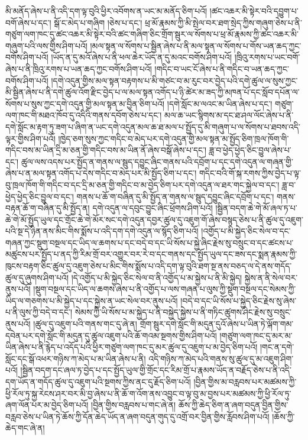 མི་མནོད་ཞེས་པ་ནི་འདི་དག་ལྟ་བུའི་ཕྱིར་འབོགས་ན་ཡང་མ་མནོད་ཅིག་པའོ། །ཚང་འཆར་མི་སྟེར་བའི་དབྱུག་པ་བགོ་ཞེས་པ་དང་། སྒོ་ང་མེད་པ་གཞིག །ཅེས་པ་དང་། ཕྲ་མོ་རྣམས་ཀྱི་མི་སྤེལ་བར་ཐག་སྲེད་ཀྱིས་གཞུག་ཅེས་པ་ནི་གཙུག་ལག་ཁང་དུ་ཚང་འཆར་མི་སྟེར་བའི་ཚང་གཞིག་ཅིང་གྲོག་སྦུར་ལ་སོགས་པ་ཕྲ་མོ་རྣམས་ཀྱི་ཚང་འཆར་མི་གཞུག་པའི་ལས་གྱིས་ཤིག་པའོ། །མལ་སྟན་ལ་སོགས་པ་སྦྱིན་ཞེས་པ་ནི་མལ་སྟན་ལ་སོགས་པ་གོས་ཡན་ཆད་ཀྱང་བགོས་ཤིག་པའོ། །ཡོད་ན་དུ་མའོ་ཞེས་པ་ནི་ཕལ་ཆེར་ཡོད་ན་དུ་མའང་བགོས་ཤིག་པའོ། །ཁྲིའུ་རགས་པ་ཡང་བགོ་ཞེས་པ་ནི་ཁྲིའུ་རགས་པ་ཡན་ཆད་ཀྱང་བགོས་ཤིག་པའོ། །གདིང་བ་ཡང་ངོ་ཞེས་པ་ནི་གདིང་བ་ཡན་ཆད་ཀྱང་བགོས་ཤིག་པའོ། །དགེ་འདུན་གྱིས་མལ་སྟན་བརྟགས་པ་མི་གཙང་བ་མ་རུང་བར་བྱེད་པའི་དགེ་ཚུལ་ལ་སུས་ཀྱང་མི་སྦྱིན་ཞེས་པ་ནི་དགེ་ཚུལ་འོག་རྫིང་བྱེད་པ་ལ་མལ་སྟན་འགོད་པ་ཉི་ཚེར་མ་ཟད་ཀྱི་མཁན་པོ་དང་སློབ་དཔོན་ལ་སོགས་པ་སུས་ཀྱང་དགེ་འདུན་གྱི་མལ་སྟན་མ་བྱིན་ཅིག་པའོ། །དགེ་སློང་མ་ལའང་མ་ཡིན་ཞེས་པ་དང་། གཙུག་ལག་ཁང་གི་མཐའ་ཁོབ་དུ་འདིའི་གནས་དབོག་ཅེས་པ་དང་། མལ་ཆ་ཡང་སྙིགས་མ་དང་ཐ་ཤལ་ལོང་ཞེས་པ་ནི་དགེ་སློང་མ་རྟག་ཏུ་ཟག་པ་ཞིག་ན་ཡང་དགེ་འདུན་མལ་ཆ་ཐ་མལ་པ་སྤྱོད་དུ་མི་གཞུག་པ་ལ་སོགས་པ་ཐབས་འདི་ལྟར་གྱིས་ཤིག་པའོ། །ཁྱེད་ཅག་སུས་ཀྱང་གདིང་བ་མེད་པར་དགེ་འདུན་གྱི་མལ་སྟན་མ་སྤྱོད་ཅིག་ཁྲལ་ཁོག་གི་གདིང་བས་མ་ཡིན་དྲི་མ་ཅན་གྱི་གདིང་བས་མ་ཡིན་ནོ་ཞེས་བསྒོ་ཞེས་པ་དང་། ཟླ་བ་ཕྱེད་ཕྱེད་ཅིང་བྱུལ་ཞེས་པ་དང་། ཚུལ་ལས་འདས་པར་སྤྱོད་ན་གནས་ལ་སྦུད་དབྱུང་ཞིང་གནས་པའི་དབྲོག་པ་དང་དགེ་འདུན་ལ་གཞན་གྱི་ཞེས་པ་ན་མལ་སྟན་འགོད་པ་དེས་གདིང་བ་མེད་པར་མི་སྤྱོད་ཅིག་པ་དང་། གདིང་བའི་གོ་སྐ་རགས་ཀྱིས་བྱེད་པ་ལྟ་བུ་ཁྲལ་ཁོག་གི་གདིང་བ་དང་དྲི་མ་ཅན་གྱི་གདིང་བ་མ་བྱེད་ཅིག་པར་དགེ་འདུན་ལ་ཐར་གང་སྐྱེལ་བ་དང་། ཟླ་བ་ཕྱེད་ཕྱེད་ཅིང་བྱུལ་བ་དང་། གནས་པ་ཆོ་ག་བཞིན་དུ་མི་སྤྱོད་ན་གནས་ལ་སྦུད་དབྱུང་ཞིང་དབྲོག་པ་དང་། གནས་བརྟན་ཆོ་ག་བཞིན་དུ་མི་སྤྱོད་ན། དགེ་འདུན་ལ་དབུང་བྱུང་ཞིང་ཕྲོགས་ཤིག་པའོ། །སྦྱིན་བདག་ཆེ་གེ་མོ་ཞལ་ཏ་པ་ཆེ་གེ་མོ་སྤྱོད་ཡུལ་དང་གྲོང་ཆེ་གེ་མོར་སང་དགེ་འདུན་དབྱར་ཚུལ་དུ་འཇུག་གོ་ཞེས་བསྙད་ཅེས་པ་ནི་ཚུལ་དུ་འཇུག་པའི་སྔ་དེ་ཉིན་ནས་མིང་གིས་སྨོས་པ་འདི་དག་དགེ་འདུན་ལ་སྙོད་ཅིག་པའོ། །འགྱོད་པ་མི་སྐྱེད་ཅིང་སེལ་བ་དང་གཞན་ཀྱང་སྡུག་བསྔལ་དང་ཡིད་ལ་ཆགས་པ་དང་བདེ་བ་དང་ཡི་སོས་པ་སྐྱེ་ཞིང་རྗེས་སུ་བསྲུང་བ་དང་ཚངས་པ་མཚུངས་པར་སྤྱོད་པ་ནད་ཀྱི་རིམ་གྲོ་བར་འགྱུར་བར་རེ་བ་དང་གནས་དང་སྤྱོད་ཡུལ་དང་ཟས་དང་སྨན་རྣམས་ཀྱི་ཁུངས་བརྟག་ཅིང་ཚུལ་དུ་འཇུག་ཅེས་པ་མིང་གིས་སྨོས་པ་འདི་དག་ལྟ་བུའི་ཐག་སྔ་ནས་བཅད་ལ་དེ་ནས་གདོད་ཚུལ་དུ་ཞུགས་ཤིག་པའོ། །དེ་འགྱོད་པ་མི་སྐྱེད་ཅིང་སེལ་བ་ནི་འགྱོད་པ་མ་སྐྱེས་པ་ནི་མི་སྐྱེད། སྐྱེས་ན་ནི་སེལ་བར་ནུས་པའོ། །སྡུག་བསྔལ་དང་ཡིད་ལ་ཆགས་ཞེས་པ་ནི་འགྱོད་པ་ལས་གཞན་པ་ལུས་ཀྱི་སྡུག་བསྔལ་དང་སེམས་ཀྱི་ཡིད་ལ་གཅགས་པ་མི་སྐྱེད་པ་དང་སྐྱེས་ན་ཡང་སེལ་བར་ནུས་པའོ། །བདེ་བ་དང་ཡི་སོས་པ་སྐྱེད་ཅིང་རྗེས་སུ་ཞེས་པ་ནི་ལུས་ཀྱི་བདེ་བ་དང་། སེམས་ཀྱི་ཡི་སོས་པ་མ་སྐྱེད་པ་ནི་བསྐྱེད་སྐྱེས་པ་ནི་གཏིང་ཚུགས་ཤིང་རྗེས་སུ་བསྲུང་ནུས་པའོ། །ཚུལ་དུ་འཇུག་པའི་གནས་གང་དུ་ཞེ་ན། གྲོག་སྦུར་དགེ་སློང་གི་མདུན་དུའོ་ཞེས་པ་ཡིན་ཏེ་ལྐོག་གམ་དབེན་པར་དགེ་སློང་གི་མདུན་དུ་ཚུལ་འཇུག་པའི་ཆོ་གའམ་སྔགས་གྱིས་ཤིག་པའོ། །གཙུག་ལག་ཁང་དུ་མར་མ་ཡིན་ཞེས་པ་ནི་རྙེད་པ་འདོད་པའི་ཕྱིར་གཙུག་ལག་ཁང་དུ་མར་ཚུལ་དུ་འཇུག་པ་མ་བྱེད་ཅིག་པའོ། །གང་ན་དགེ་སློང་དང་སྒོ་འཕར་གཉིས་ཀ་མེད་པ་མ་ཡིན་ཞེས་པ་ནི། འདི་གཉིས་ཀ་མེད་པའི་གནས་སུ་ཚུལ་དུ་མ་འཇུག་ཤིག་པའོ། །སྦྱིན་བདག་དང་ཞལ་ཏ་བྱེད་པ་དང་སྤྱོད་ཡུལ་གྱི་གྲོང་དང་རིམ་གྲོ་པ་རྣམས་ཡོད་ན་བརྗོད་ཅེས་པ་ནི་འདི་དག་ཡོད་ན་གདོད་ཚུལ་དུ་འཇུག་པའི་སྔགས་ཀྱིས་ནང་དུ་རྗོད་ཅིག་པའོ། །བྱིན་གྱིས་མ་བརླབས་པར་མཚམས་ཀྱི་ཕྱི་རོལ་ཏུ་སྐྱ་རེངས་ཤར་བར་མི་བྱ་ཞེས་པ་ནི་ཆོ་ག་འོག་ནས་འབྱུང་བ་ལྟ་བུ་མ་བྱས་པར་མཚམས་ཀྱི་ཕྱི་རོལ་ཏུ་ཞག་ལོན་པར་མ་བྱེད་ཅིག་པའོ། །བྱིན་གྱིས་བརླབས་པ་གང་ཞེ་ན། ཆོས་ཀྱི་ཆེད་ཅིག་ན་ཞག་བདུན་བྱིན་གྱིས་བརླབ་ཅེས་པ་ཡིན་ཏེ་ཆོས་ཀྱི་དོན་ཆེད་ཡོད་ན་ཞག་བདུན་གུད་དུ་འགྲོ་བར་བྱིན་གྱིས་རློབས་ཤིག་པའོ། །ཆོས་ཀྱི་ཆེད་གང་ཞེ་ན། 